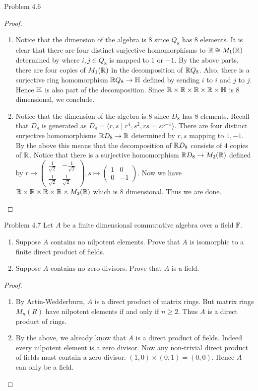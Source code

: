 \documentclass[a4paper]{article}
\begin{document}
\begin{ex}{Problem 4.6}{}
\begin{proof}
\begin{enumerate}
\item Notice that the dimension of the algebra is $8$ since $Q_8$ has $8$ elements. It is clear that there are four distinct surjective homomorphisms to $\mathbb{R}\cong M_1(\mathbb{R})$ determined by where $i,j\in Q_8$ is mapped to $1$ or $-1$. By the above parts, there are four copies of $M_1(\mathbb{R})$ in the decomposition of $\mathbb{R} Q_8$. Also, there is a surjective ring homomorphism $\mathbb{R} Q_8\to\mathbb{H}$ defined by sending $i$ to $i$ and $j$ to $j$. Hence $\mathbb{H}$ is also part of the decomposition. Since $\mathbb{R}\times\mathbb{R}\times\mathbb{R}\times\mathbb{R}\times\mathbb{H}$ is $8$ dimensional, we conclude. 
\item Notice that the dimension of the algebra is $8$ since $D_8$ has $8$ elements. Recall that $D_8$ is generated as $D_8=\langle r,s\;|\;r^4,s^2,rs=sr^{-1}\rangle$. There are four distinct surjective homomorphisms $\mathbb{R} D_8\to\mathbb{R}$ determined by $r,s$ mapping to $1,-1$. By the above this means that the decomposition of $\mathbb{R} D_8$ consists of $4$ copies of $\mathbb{R}$. Notice that there is a surjective homomorphism $\mathbb{R} D_8\to M_2(\mathbb{R})$ defined by $r\mapsto\begin{pmatrix}\frac{1}{\sqrt2}&-\frac{1}{\sqrt2}\\\frac{1}{\sqrt2}&\frac{1}{\sqrt2}\end{pmatrix},s\mapsto\begin{pmatrix}1&0\\0&-1\end{pmatrix}$. Now we have $\mathbb{R}\times\mathbb{R}\times\mathbb{R}\times\mathbb{R}\times M_2(\mathbb{R})$ which is $8$ dimensional. Thus we are done. 
\end{enumerate}
\end{proof}
\end{ex}

\begin{ex}{Problem 4.7}{} Let $A$ be a finite dimensional commutative algebra over a field $\mathbb{F}$. 
\begin{enumerate}
\item Suppose $A$ contains no nilpotent elements. Prove that $A$ is isomorphic to a finite direct product of fields. 
\item Suppose $A$ contains no zero divisors. Prove that $A$ is a field. 
\end{enumerate} \tcbline
\begin{proof}~\\
\begin{enumerate}
\item By Artin-Wedderburn, $A$ is a direct product of matrix rings. But matrix rings $M_n(R)$ have nilpotent elements if and only if $n\geq 2$. Thus $A$ is a direct product of rings. 
\item By the above, we already know that $A$ is a direct product of fields. Indeed every nilpotent element is a zero divisor. Now any non-trivial direct product of fields must contain a zero divisor: $(1,0)\times(0,1)=(0,0)$. Hence $A$ can only be a field. 
\end{enumerate}
\end{proof}
\end{ex}
\end{document}
